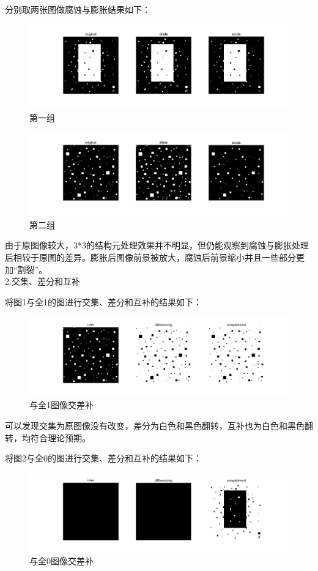 \documentclass[12pt]{article}
\begin{document}
分别取两张图做腐蚀与膨胀结果如下：
\begin{figure}[H]
	\centering
	\includegraphics[width=1\linewidth]{figures/ed1}
	\caption{第一组}
\end{figure}
\begin{figure}[H]
	\centering
	\includegraphics[width=1\linewidth]{figures/ed2}
	\caption{第二组}
\end{figure}

由于原图像较大，3*3的结构元处理效果并不明显，但仍能观察到腐蚀与膨胀处理后相较于原图的差异。膨胀后图像前景被放大，腐蚀后前景缩小并且一些部分更加“割裂”。
\\

2.交集、差分和互补

将图1与全1的图进行交集、差分和互补的结果如下：
\begin{figure}[H]
	\centering
	\includegraphics[width=0.8\linewidth]{figures/2}
	\caption{与全1图像交差补}
\end{figure}

可以发现交集为原图像没有改变，差分为白色和黑色翻转，互补也为白色和黑色翻转，均符合理论预期。

将图2与全0的图进行交集、差分和互补的结果如下：
\begin{figure}[H]
	\centering
	\includegraphics[width=0.8\linewidth]{figures/1}
	\caption{与全0图像交差补}
\end{figure}
\end{document}
